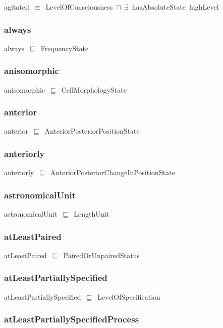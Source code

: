 \documentclass{article}
\begin{document}
agitated~\ensuremath{\equiv}~LevelOfConsciousness~\ensuremath{\sqcap}~\ensuremath{\exists}~hasAbsoluteState~highLevel

\subsubsection*{always}

always~\ensuremath{\sqsubseteq}~FrequencyState~

\subsubsection*{anisomorphic}

anisomorphic~\ensuremath{\sqsubseteq}~CellMorphologyState~

\subsubsection*{anterior}

anterior~\ensuremath{\sqsubseteq}~AnteriorPosteriorPositionState~

\subsubsection*{anteriorly}

anteriorly~\ensuremath{\sqsubseteq}~AnteriorPosteriorChangeInPositionState~

\subsubsection*{astronomicalUnit}

astronomicalUnit~\ensuremath{\sqsubseteq}~LengthUnit~

\subsubsection*{atLeastPaired}

atLeastPaired~\ensuremath{\sqsubseteq}~PairedOrUnpairedStatus~

\subsubsection*{atLeastPartiallySpecified}

atLeastPartiallySpecified~\ensuremath{\sqsubseteq}~LevelOfSpecification~

\subsubsection*{atLeastPartiallySpecifiedProcess}
\end{document}
